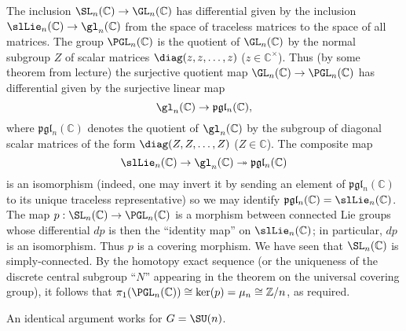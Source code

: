 \documentclass[reqno]{amsart} 
\begin{document}
\begin{itemize}
  The inclusion $\SL_n(\mathbb{C}) \rightarrow
  \GL_n(\mathbb{C})$
  has differential
  given by the inclusion
  $\slLie_n(\mathbb{C}) \rightarrow \gl_n(\mathbb{C})$
  from the space of traceless matrices to the space of all
  matrices.
  The group $\PGL_n(\mathbb{C})$
  is the quotient of $\GL_n(\mathbb{C})$
  by the normal subgroup $Z$ of scalar matrices
  $\diag(z,z,\dotsc,z)$
  ($z \in \mathbb{C}^\times$).
  Thus (by some theorem from lecture)
  the surjective quotient map
  $\GL_n(\mathbb{C}) \rightarrow \PGL_n(\mathbb{C})$
  has differential given by the surjective linear map
  \begin{equation*}
  \gl_n(\mathbb{C}) \rightarrow \mathfrak{p}\mathfrak{g}\mathfrak{l}_n(\mathbb{C}),
  \end{equation*}
  where
  $\mathfrak{p}\mathfrak{g}\mathfrak{l}_n(\mathbb{C})$
  denotes the quotient of
  $\gl_n(\mathbb{C})$ by the subgroup of diagonal scalar matrices
  of the form $\diag(Z,Z,\dotsc,Z)$ ($Z \in \mathbb{C}$).
  The composite map
  \begin{equation*}
  \slLie_n(\mathbb{C}) \rightarrow \gl_n(\mathbb{C})
  \twoheadrightarrow
  \mathfrak{p}\mathfrak{g}\mathfrak{l}_n(\mathbb{C})
  \end{equation*}
  is an isomorphism (indeed,
  one may invert it by sending
  an element 
  of $\mathfrak{p}\mathfrak{g}\mathfrak{l}_n(\mathbb{C})$
  to its unique traceless representative)
  so we may identify
  $\mathfrak{p}\mathfrak{g}\mathfrak{l}_n(\mathbb{C}) = \slLie_n(\mathbb{C})$.
  The map $p : \SL_n(\mathbb{C}) \rightarrow \PGL_n(\mathbb{C})$
  is a morphism between connected Lie groups
  whose differential
  $d p$ is then the ``identity map'' on $\slLie_n(\mathbb{C})$;
  in particular, $d p$ is an isomorphism.
  Thus $p$ is a covering morphism.
  We have seen that $\SL_n(\mathbb{C})$ is simply-connected.
  By the homotopy exact sequence
  (or the uniqueness of the discrete central subgroup ``$N$''
  appearing in the
  theorem on the universal covering group),
  it follows that $\pi_1(\PGL_n(\mathbb{C})) \cong \ker(p) =
  \mu_n \cong \mathbb{Z}/n$,
  as required.

  An identical argument works for $G = \SU(n)$.


\end{itemize}
\end{document}
